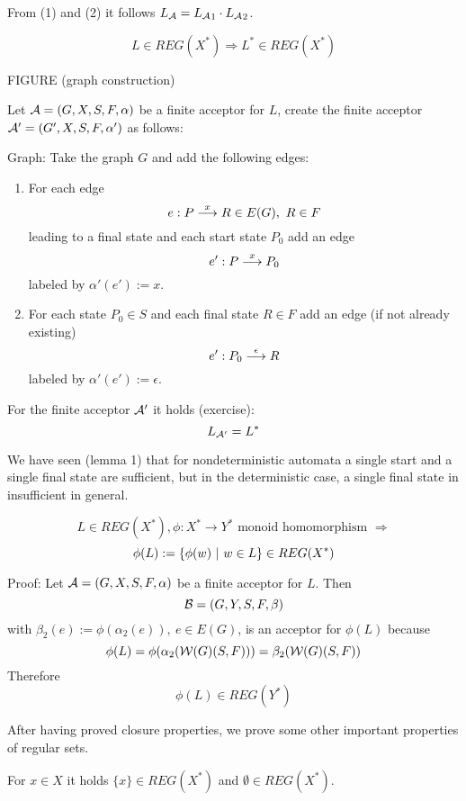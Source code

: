From (1) and (2) it follows $\mbox{$L_{\mathcal{A}}$} = \mbox{$L_{\mathcal{A}}$}_1 \cdot
\mbox{$L_{\mathcal{A}}$}_2$.

\begin{theorem}
\[ L \in REG(X^*) \Rightarrow L^* \in REG(X^*) \]
\end{theorem}

FIGURE (graph construction)

Let $\mbox{$\mathcal{A}$} = (G, X, S, F, \alpha)$	be a finite acceptor for $L$, create the
finite acceptor $\mbox{$\mathcal{A'}$} = (G', X, S, F, \alpha')$ as follows:

Graph: Take the graph $G$ and add the following edges: 

\begin{enumerate}
  \item For each edge \[e : P \stackrel{x}{\longrightarrow} R \in E(G),\ R \in F\] leading to a
  final state and each start state $P_0$ add an edge \[e' : P \stackrel{x}{\longrightarrow} P_0 \]
  labeled by $\alpha'(e') := x$.
  \item For each state $P_0 \in S$ and each final state $R \in F$ add an edge
  (if not already existing) \[ e' : P_0 \stackrel{\epsilon}{\longrightarrow} R \]
  labeled by $\alpha'(e') := \epsilon$.
\end{enumerate}

For the finite acceptor $\mbox{$\mathcal{A'}$}$ it holds (exercise): \[ \mbox{$L_{\mathcal{A'}}$} = L^* \]

We have seen (lemma 1) that for nondeterministic automata a single start and a
single final state are sufficient, but in the deterministic case, a single final
state in insufficient in general.

\begin{theorem}
\[ L \in REG(X^*), \phi : X^* \to Y^* \mbox{ monoid homomorphism } \Rightarrow
\]
\[ \phi(L) := \{ \phi(w) \ |\  w \in L \} \in REG(X^*) \]
\end{theorem}

Proof: Let $\mbox{$\mathcal{A}$} = (G, X, S, F, \alpha)$ be a finite acceptor for $L$. Then \[
\mbox{$\mathcal{B}$} = (G, Y, S, F, \beta)\] with $\beta_2(e) := \phi(\alpha_2(e)),\ e \in
E(G)$, is an acceptor for $\phi(L)$ because \[\phi(L) =
\phi(\alpha_2(\mbox{$\mathcal{W}(G)$}(S, F))) = \beta_2(\mbox{$\mathcal{W}(G)$}(S,F))\]
Therefore \[ \phi(L) \in REG(Y^*) \]

After having proved closure properties, we prove some other important properties
of regular sets.

\begin{lemma}
For $x \in X$ it holds $\{ x \} \in REG(X^*)$ and $\emptyset \in REG(X^*)$.
\end{lemma}

